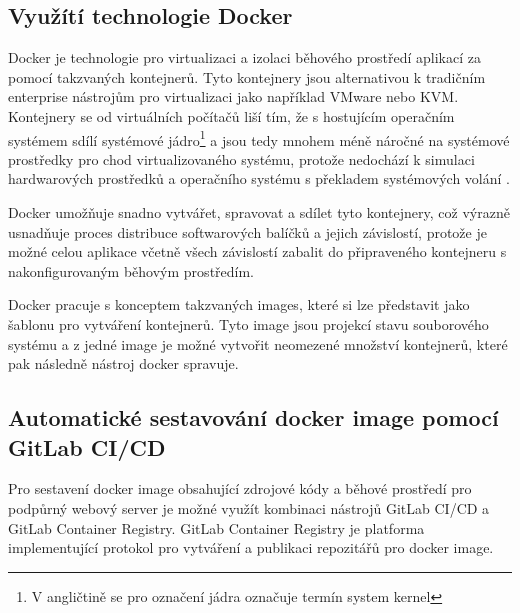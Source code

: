 
\subsection{Využítí technologie Docker}\label{sec:docker}

Docker je technologie pro virtualizaci a izolaci běhového prostředí aplikací za pomocí takzvaných kontejnerů. Tyto kontejnery jsou alternativou k tradičním enterprise nástrojům pro virtualizaci jako například VMware nebo KVM. Kontejnery se od virtuálních počítačů liší tím, že s hostujícím operačním systémem sdílí systémové jádro\footnote{V angličtině se pro označení jádra označuje termín system kernel} a jsou tedy mnohem méně náročné na systémové prostředky pro chod virtualizovaného systému, protože nedochází k simulaci hardwarových prostředků a operačního systému s překladem systémových volání \cite[kap. 1]{kane_docker_2018}.

Docker umožňuje snadno vytvářet, spravovat a sdílet tyto kontejnery, což výrazně usnadňuje proces distribuce softwarových balíčků a jejich závislostí, protože je možné celou aplikace včetně všech závislostí zabalit do připraveného kontejneru s nakonfigurovaným běhovým prostředím. 

Docker pracuje s konceptem takzvaných images, které si lze představit jako šablonu pro vytváření kontejnerů. Tyto image jsou projekcí stavu souborového systému a z jedné image je možné vytvořit neomezené množství kontejnerů, které pak následně nástroj docker spravuje. 


\subsection{Automatické sestavování docker image pomocí GitLab CI/CD}

Pro sestavení docker image obsahující zdrojové kódy a běhové prostředí pro podpůrný webový server je možné využít kombinaci nástrojů GitLab CI/CD a GitLab Container Registry. GitLab Container Registry je platforma implementující protokol pro vytváření a publikaci repozitářů pro docker image.


